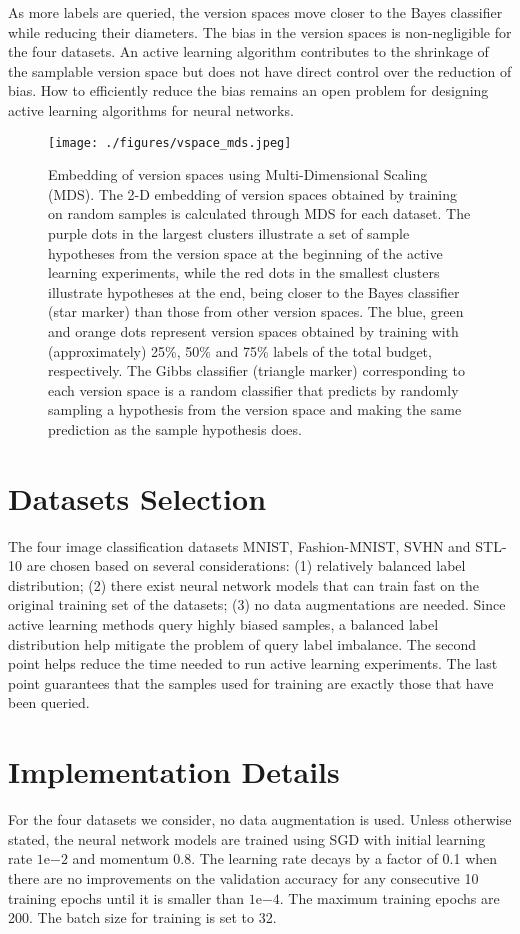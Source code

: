 \documentclass[runningheads, envcountsame, a4paper]{llncs}
\begin{document}
As more labels are queried, the version spaces move closer to the Bayes classifier while reducing their diameters. The bias in the version spaces is non-negligible for the four datasets. An active learning algorithm contributes to the shrinkage of the samplable version space but does not have direct control over the reduction of bias. How to efficiently reduce the bias remains an open problem for designing active learning algorithms for neural networks.
\begin{figure*}[ht!]
\begin{center}
\texttt{[image: ./figures/vspace\_mds.jpeg]}
\end{center}
   \caption{Embedding of version spaces using Multi-Dimensional Scaling (MDS). The 2-D embedding of version spaces obtained by training on random samples is calculated through MDS for each dataset. The purple dots in the largest clusters illustrate a set of sample hypotheses from the version space at the beginning of the active learning experiments, while the red dots in the smallest clusters illustrate hypotheses at the end, being closer to the Bayes classifier (star marker) than those from other version spaces. The blue, green and orange dots represent version spaces obtained by training with (approximately) 25\%, 50\% and 75\% labels of the total budget, respectively. The Gibbs classifier (triangle marker) corresponding to each version space is a random classifier that predicts by randomly sampling a hypothesis from the version space and making the same prediction as the sample hypothesis does.}
\label{fig:vspace_mds}
\end{figure*}


\section{Datasets Selection}
The four image classification datasets MNIST, Fashion-MNIST, SVHN and STL-10 are chosen based on several considerations: (1) relatively balanced label distribution; (2) there exist neural network models that can train fast on the original training set of the datasets; (3) no data augmentations are needed. Since active learning methods query highly biased samples, a balanced label distribution help mitigate the problem of query label imbalance. The second point helps reduce the time needed to run active learning experiments. The last point guarantees that the samples used for training are exactly those that have been queried.


\section{Implementation Details}
For the four datasets we consider, no data augmentation is used. Unless otherwise stated, the neural network models are trained using SGD with initial learning rate $1\mathrm{e}{-2}$ and momentum 0.8. The learning rate decays by a factor of 0.1 when there are no improvements on the validation accuracy for any consecutive 10 training epochs until it is smaller than $1\mathrm{e}{-4}$. The maximum training epochs are 200. The batch size for training is set to 32. 
\end{document}

